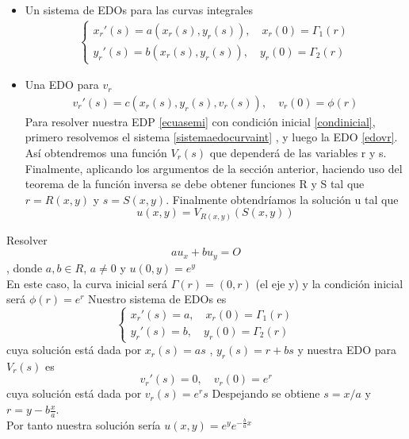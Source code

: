 \begin{itemize}
    \item Un sistema de EDOs para las curvas integrales
    \begin{eqnarray}
        \begin{cases}
            \label{sistemaedocurvaint}
             x_r'(s)=a(x_r(s),y_r(s)), \quad x_r(0)=\Gamma_1(r)\\
             y_r'(s)=b(x_r(s),y_r(s)), \quad y_r(0)=\Gamma_2(r)
        \end{cases}
    \end{eqnarray}
    \item Una EDO para $v_r$\label{edovr}
    \begin{eqnarray}
        v_r'(s)=c(x_r(s),y_r(s),v_r(s)),\quad v_r(0)=\phi(r)
    \end{eqnarray}
    Para resolver nuestra EDP \ref{ecuasemi} con condición  inicial \ref{condinicial}, primero resolvemos el sistema \ref{sistemaedocurvaint} , y luego la EDO \ref{edovr}. Así obtendremos una función $V_r(s)$ que dependerá de las variables r y s.
    Finalmente, aplicando los argumentos de la sección anterior, haciendo uso del teorema de la función inversa se debe obtener funciones R y S tal que $r=R(x,y)$ y  $s=S(x,y)$.
    Finalmente obtendríamos la solución u tal que $$u(x,y)=V_{R(x,y)}(S(x,y))$$
 \end{itemize}
\begin{Ejm}
    Resolver $$au_x+bu_y=O$$, donde $a,b\in R$, $a\not=0$ y $u(0,y)=e^y$\\
    En este caso, la curva inicial será $\Gamma(r)=(0,r)$ (el eje y) y la condición inicial será $\phi(r)=e^r$
    Nuestro sistema de EDOs es 
    $$\begin{cases}
        x_r'(s)=a, \quad x_r(0)=\Gamma_1(r)\\
        y_r'(s)=b, \quad y_r(0)=\Gamma_2(r)
    \end{cases}$$
    cuya solución está dada por $x_r(s)=as$ , $y_r(s)=r+bs$
    y nuestra EDO para $V_r(s)$ es
    $$ v_r'(s)=0,\quad v_r(0)=e^r$$
    cuya solución está dada por $v_r(s)=e^rs$
    Despejando se obtiene $s=x/a$ y $r=y-b\frac{x}{a}$.\\Por tanto nuestra solución sería $u(x,y)=e^ye^{-\frac{b}{a}x}$
\end{Ejm}